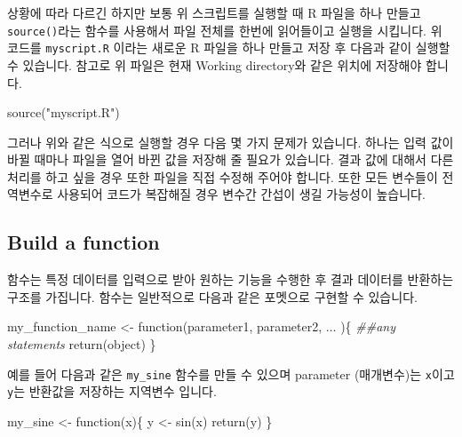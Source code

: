 \documentclass[
  a4paper,
]{book}
\newenvironment{Shaded}{\begin{snugshade}}{\end{snugshade}}
\newcommand{\ControlFlowTok}[1]{\textcolor[rgb]{0.00,0.23,0.31}{#1}}
\newcommand{\DocumentationTok}[1]{\textcolor[rgb]{0.37,0.37,0.37}{\textit{#1}}}
\newcommand{\FunctionTok}[1]{\textcolor[rgb]{0.28,0.35,0.67}{#1}}
\newcommand{\NormalTok}[1]{\textcolor[rgb]{0.00,0.23,0.31}{#1}}
\newcommand{\OtherTok}[1]{\textcolor[rgb]{0.00,0.23,0.31}{#1}}
\newcommand{\StringTok}[1]{\textcolor[rgb]{0.13,0.47,0.30}{#1}}
\begin{document}
상황에 따라 다르긴 하지만 보통 위 스크립트를 실행할 때 R 파일을 하나
만들고 \texttt{source()}라는 함수를 사용해서 파일 전체를 한번에
읽어들이고 실행을 시킵니다. 위 코드를 \texttt{myscript.R} 이라는 새로운
R 파일을 하나 만들고 저장 후 다음과 같이 실행할 수 있습니다. 참고로 위
파일은 현재 Working directory와 같은 위치에 저장해야 합니다.

\begin{Shaded}
\begin{Highlighting}[]
\FunctionTok{source}\NormalTok{(}\StringTok{"myscript.R"}\NormalTok{)}
\end{Highlighting}
\end{Shaded}

그러나 위와 같은 식으로 실행할 경우 다음 몇 가지 문제가 있습니다. 하나는
입력 값이 바뀔 때마나 파일을 열어 바뀐 값을 저장해 줄 필요가 있습니다.
결과 값에 대해서 다른 처리를 하고 싶을 경우 또한 파일을 직접 수정해
주어야 합니다. 또한 모든 변수들이 전역변수로 사용되어 코드가 복잡해질
경우 변수간 간섭이 생길 가능성이 높습니다.

\hypertarget{build-a-function}{%
\subsection{Build a function}\label{build-a-function}}

함수는 특정 데이터를 입력으로 받아 원하는 기능을 수행한 후 결과 데이터를
반환하는 구조를 가집니다. 함수는 일반적으로 다음과 같은 포멧으로 구현할
수 있습니다.

\begin{Shaded}
\begin{Highlighting}[]
\NormalTok{my\_function\_name }\OtherTok{\textless{}{-}} \ControlFlowTok{function}\NormalTok{(parameter1, parameter2, ... )\{}
  \DocumentationTok{\#\#any statements}
  \FunctionTok{return}\NormalTok{(object)}
\NormalTok{\}}
\end{Highlighting}
\end{Shaded}

예를 들어 다음과 같은 \texttt{my\_sine} 함수를 만들 수 있으며 parameter
(매개변수)는 \texttt{x}이고 \texttt{y}는 반환값을 저장하는 지역변수
입니다.

\begin{Shaded}
\begin{Highlighting}[]
\NormalTok{my\_sine }\OtherTok{\textless{}{-}} \ControlFlowTok{function}\NormalTok{(x)\{}
\NormalTok{    y }\OtherTok{\textless{}{-}} \FunctionTok{sin}\NormalTok{(x)}
    \FunctionTok{return}\NormalTok{(y)}
\NormalTok{\}}
\end{Highlighting}
\end{Shaded}
\end{document}
